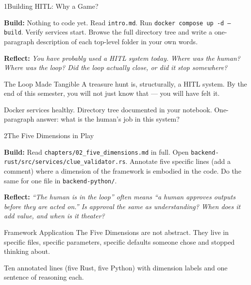 \documentclass[
  11pt,
  oneside,
  DIV=12,
]{scrartcl}
\newcommand{\build}[1]{\textbf{\color{SpringMoss}Build:} #1}
\newcommand{\reflect}[1]{\textbf{\color{ConceptBlue}Reflect:} \textit{#1}}
\begin{document}
\begin{milestone}{1}{Building HITL: Why a Game?}

\build{Nothing to code yet. Read \texttt{intro.md}. Run
\texttt{docker compose up -d --build}. Verify services start.
Browse the full directory tree and write a one-paragraph description of
each top-level folder in your own words.}

\medskip
\reflect{You have probably used a HITL system today. Where was the human?
Where was the loop? Did the loop actually close, or did it stop somewhere?}

\begin{hitlconcept}{The Loop Made Tangible}
  A treasure hunt is, structurally, a HITL system. By the end of this
  semester, you will not just know that — you will have felt it.
\end{hitlconcept}

\begin{checkpoint}
  Docker services healthy. Directory tree documented in your notebook.
  One-paragraph answer: what is the human's job in this system?
\end{checkpoint}

\end{milestone}

\begin{milestone}{2}{The Five Dimensions in Play}

\build{Read \texttt{chapters/02\_five\_dimensions.md} in full. Open
\texttt{backend-rust/src/services/clue\_validator.rs}. Annotate five
specific lines (add a comment) where a dimension of the framework is
embodied in the code. Do the same for one file in \texttt{backend-python/}.}

\medskip
\reflect{``The human is in the loop'' often means ``a human approves outputs
before they are acted on.'' Is approval the same as understanding?
When does it add value, and when is it theater?}

\begin{hitlconcept}{Framework Application}
  The Five Dimensions are not abstract. They live in specific files,
  specific parameters, specific defaults someone chose and stopped thinking
  about.
\end{hitlconcept}

\begin{checkpoint}
  Ten annotated lines (five Rust, five Python) with dimension labels and
  one sentence of reasoning each.
\end{checkpoint}

\end{milestone}
\end{document}
